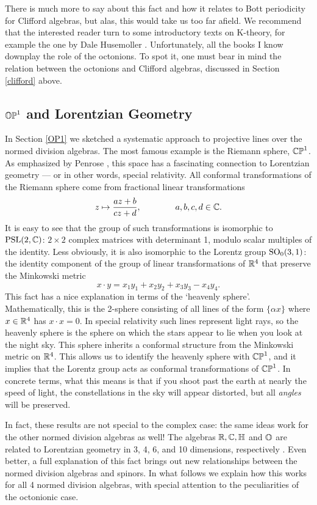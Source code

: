 There is much more to say about this fact and how it relates to Bott
periodicity for Clifford algebras, but alas, this would take us too far
afield.  We recommend that the interested reader turn to some
introductory texts on K-theory, for example the one by Dale Husemoller
\cite{Husemoller}.  Unfortunately, all the books I know downplay the
role of the octonions.  To spot it, one must bear in mind the relation 
between the octonions and Clifford algebras, discussed in Section
\ref{clifford} above.
 
\subsection{${\mathbb {OP}}^1$ and Lorentzian Geometry}  \label{lorentz} 
 
In Section \ref{OP1} we sketched a systematic approach to projective 
lines over the normed division algebras.  The most famous example is the 
Riemann sphere, ${\mathbb {CP}}^1$.  As emphasized by Penrose \cite{PR}, this space 
has a fascinating connection to Lorentzian geometry --- or in other words, 
special relativity.  All conformal transformations of the Riemann 
sphere come from fractional linear transformations   
\[        z \mapsto {az + b\over cz + d}, \qquad \qquad a,b,c,d \in {\mathbb C}.  \] 
It is easy to see that the group of such transformations is isomorphic 
to ${\rm PSL}(2,{\mathbb C})$: $2 \times 2$ complex matrices with determinant 1,  
modulo scalar multiples of the identity.  Less obviously, it is also 
isomorphic to the Lorentz group ${\rm SO}_0(3,1)$: the identity component of 
the group of linear transformations of ${\mathbb R}^4$ that preserve the 
Minkowski metric 
\[     x \cdot y = x_1 y_1 + x_2 y_2 + x_3 y_3 - x_4 y_4 .\] 
This fact has a nice explanation in terms of the `heavenly sphere'.  
Mathematically, this is the 2-sphere consisting of all lines of the form 
$\{\alpha x\}$ where $x \in {\mathbb R}^4$ has $x \cdot x = 0$.  In special 
relativity such lines represent light rays, so the heavenly sphere is 
the sphere on which the stars appear to lie when you look at the night 
sky.  This sphere inherits a conformal structure from the Minkowski 
metric on ${\mathbb R}^4$.  This allows us to identify the heavenly sphere with 
${\mathbb {CP}}^1$, and it implies that the Lorentz group acts as conformal 
transformations of ${\mathbb {CP}}^1$.  In concrete terms, what this means is that 
if you shoot past the earth at nearly the speed of light, the 
constellations in the sky will appear distorted, but all {\it angles} 
will be preserved. 
 
In fact, these results are not special to the complex case: the same
ideas work for the other normed division algebras as well!  The algebras
${\mathbb R}, {\mathbb C}, {\mathbb H}$ and ${\mathbb O}$ are related to Lorentzian geometry in 3, 4, 6, and
10 dimensions, respectively \cite{MD,MS,MS2,Schray,Sudbery}.  Even
better, a full explanation of this fact brings out new relationships
between the normed division algebras and spinors.  In what follows we
explain how this works for all 4 normed division algebras, with special
attention to the peculiarities of the octonionic case.
 
